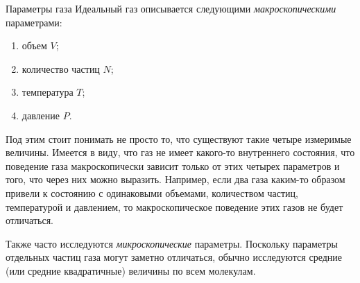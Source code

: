 \documentclass{article}
\begin{document}
	\begin{section}{Параметры газа}
		Идеальный газ описывается следующими \textit{макроскопическими} параметрами:

		\begin{enumerate}
			\item объем $V$;
			\item количество частиц $N$;
			\item температура $T$;
			\item давление $P$.
		\end{enumerate}

		Под этим стоит понимать не просто то, что существуют такие четыре измеримые величины. Имеется в виду, что газ не имеет какого-то внутреннего состояния, что поведение газа макроскопически зависит только от этих четырех параметров и того, что через них можно выразить. Например, если два газа каким-то образом привели к состоянию с одинаковыми объемами, количеством частиц, температурой и давлением, то макроскопическое поведение этих газов не будет отличаться.

		Также часто исследуются \textit{микроскопические} параметры. Поскольку параметры отдельных частиц газа могут заметно отличаться, обычно исследуются средние (или средние квадратичные) величины по всем молекулам.
	\end{section}
\end{document}
